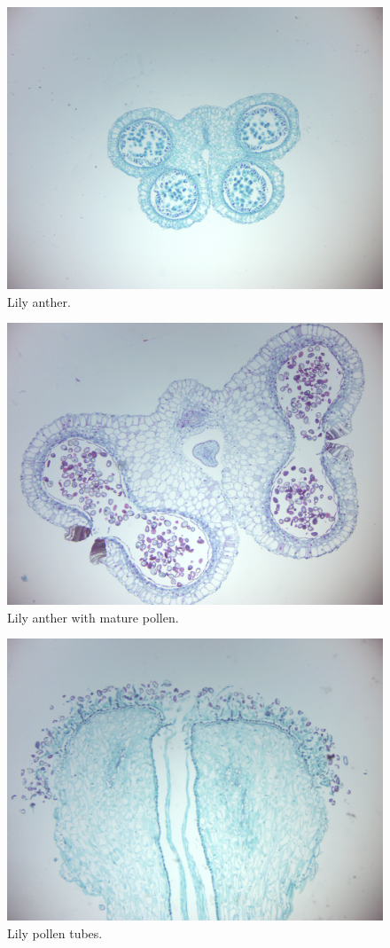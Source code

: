 \begin{figure}

{\centering \includegraphics[width=0.7\linewidth]{./figures/gymnosperms/lily_anther}

}

\caption{Lily anther.}\label{fig:lilianther}
\end{figure}

\begin{figure}

{\centering \includegraphics[width=0.7\linewidth]{./figures/gymnosperms/lily_pollen}

}

\caption{Lily anther with mature pollen.}\label{fig:lilipollen}
\end{figure}

\begin{figure}

{\centering \includegraphics[width=0.7\linewidth]{./figures/gymnosperms/lily_tubes}

}

\caption{Lily pollen tubes.}\label{fig:lilitubes}
\end{figure}

